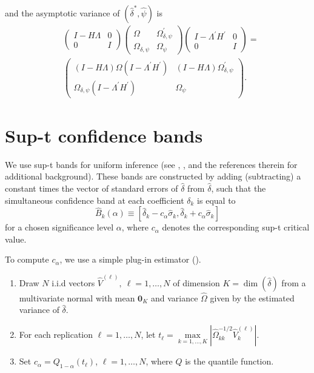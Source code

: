 \documentclass[12pt]{article}
\begin{document}
and the asymptotic variance of $\left(\widehat{\delta}^{*},\widehat{\psi}\right)$ is
\begin{align*}
&
\begin{pmatrix}I-H\Lambda & 0\\
0 & I
\end{pmatrix}\begin{pmatrix}\Omega & \Omega_{\delta,\psi}^{\prime}\\
\Omega_{\delta,\psi} & \Omega_{\psi}
\end{pmatrix}\begin{pmatrix}I-\Lambda^{\prime}H^{\prime} & 0\\
0 & I
\end{pmatrix}=\\
&\begin{pmatrix}(I-H\Lambda)\Omega(I-\Lambda^{\prime}H^{\prime}) & (I-H\Lambda)\Omega_{\delta,\psi}^{\prime}\\
\Omega_{\delta,\psi}(I-\Lambda^{\prime}H^{\prime}) & \Omega_{\psi}
\end{pmatrix}.
\end{align*}

\section{Sup-t confidence bands}
\label{sec:sup-t}

We use sup-t bands for uniform inference (see \citet{freyberger2018uniform}, \citet{montiel2019simultaneous}, and the references therein for additional background). These bands are constructed by adding (subtracting) a constant times the vector of standard errors of $\hat{\delta}$ from $\hat{\delta}$, such that the simultaneous confidence band at each coefficient $\delta_k$ is equal to
\begin{equation*}
\hat{B}_k(\alpha) \equiv \left[ \hat{\delta}_k - c_\alpha \hat{\sigma}_k , \hat{\delta}_k + c_\alpha \hat{\sigma}_k  \right ]
\end{equation*}
for a chosen significance level $\alpha$, where $c_\alpha$ denotes the corresponding sup-t critical value.

To compute $c_\alpha$, we use a simple plug-in estimator (\cite{montiel2019simultaneous}).
\begin{enumerate}
	\item Draw $N$ i.i.d vectors $\hat{V}^{(\ell)},\ \ell = 1,\ldots,N$ of dimension $K=\dim(\hat{\delta})$ from a multivariate normal with mean $\mathbf{0}_K$ and variance $\hat{\Omega}$ given by the estimated variance of $\hat{\delta}$.
	\item For each replication $\ell=1,\ldots, N$, let $t_\ell=\underset{k=1,...,K}{\max} \left| \hat{\Omega}_{kk}^{-1/2} \hat{V}_k^{(\ell)} \right|$.
	\item Set $c_\alpha = Q_{1-\alpha} \left( t_\ell \right)$, $\ell=1,\ldots, N$, where $Q$ is the quantile function.
\end{enumerate}
\end{document}
